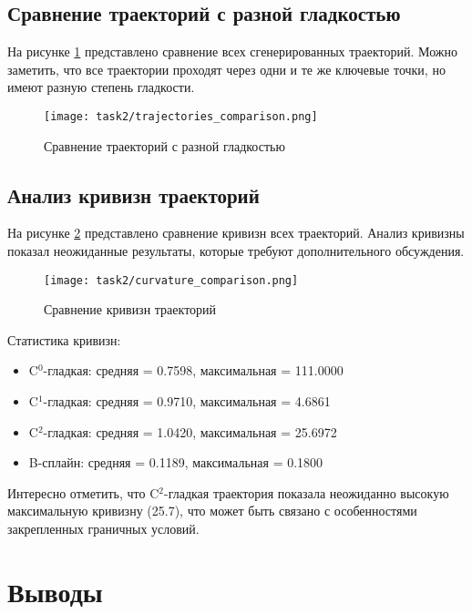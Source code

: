 \subsection{Сравнение траекторий с разной гладкостью}

На рисунке \ref{fig:trajectories_comparison} представлено сравнение всех сгенерированных траекторий. Можно заметить, что все траектории проходят через одни и те же ключевые точки, но имеют разную степень гладкости.

\begin{figure}[H]
\centering
\texttt{[image: task2/trajectories\_comparison.png]}
\caption{Сравнение траекторий с разной гладкостью}
\label{fig:trajectories_comparison}
\end{figure}

\subsection{Анализ кривизн траекторий}

На рисунке \ref{fig:curvature_comparison} представлено сравнение кривизн всех траекторий. Анализ кривизны показал неожиданные результаты, которые требуют дополнительного обсуждения.

\begin{figure}[H]
\centering
\texttt{[image: task2/curvature\_comparison.png]}
\caption{Сравнение кривизн траекторий}
\label{fig:curvature_comparison}
\end{figure}

Статистика кривизн:
\begin{itemize}
\item C$^0$-гладкая: средняя = 0.7598, максимальная = 111.0000
\item C$^1$-гладкая: средняя = 0.9710, максимальная = 4.6861
\item C$^2$-гладкая: средняя = 1.0420, максимальная = 25.6972
\item B-сплайн: средняя = 0.1189, максимальная = 0.1800
\end{itemize}

Интересно отметить, что C$^2$-гладкая траектория показала неожиданно высокую максимальную кривизну (25.7), что может быть связано с особенностями закрепленных граничных условий.

\section{Выводы}

